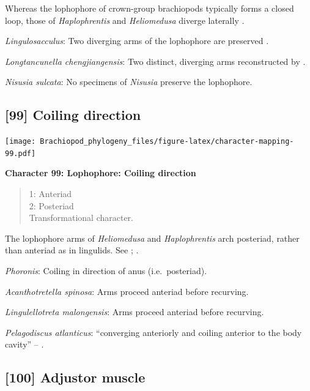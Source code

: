 \documentclass[]{book}
\theoremstyle{definition}
\theoremstyle{definition}
\theoremstyle{definition}
\theoremstyle{remark}
\begin{document}
Whereas the lophophore of crown-group brachiopods typically forms a
closed loop, those of \emph{Haplophrentis} and \emph{Heliomedusa}
diverge laterally \citep{Moysiuk2017Hyolithsare}.

\emph{Lingulosacculus}: Two diverging arms of the lophophore are
preserved \citep{Balthasar2009EarlyCambrian}.

\emph{Longtancunella chengjiangensis}: Two distinct, diverging arms
reconstructed by \citet{Zhang2007Agregarious}.

\emph{Nisusia sulcata}: No specimens of \emph{Nisusia} preserve the
lophophore.

\hypertarget{coiling-direction}{%
\subsection*{{[}99{]} Coiling direction}\label{coiling-direction}}

\texttt{[image: Brachiopod\_phylogeny\_files/figure-latex/character-mapping-99.pdf]}

\textbf{Character 99: Lophophore: Coiling direction}

\begin{quote}
1: Anteriad\\
2: Posteriad\\
Transformational character.
\end{quote}

The lophophore arms of \emph{Heliomedusa} and \emph{Haplophrentis} arch
posteriad, rather than anteriad as in lingulids. See
\citet{Zhang2009Architectureand}; \citet{Moysiuk2017Hyolithsare}.

\emph{Phoronis}: Coiling in direction of anus (i.e.~posteriad).

\emph{Acanthotretella spinosa}: Arms proceed anteriad before recurving.

\emph{Lingulellotreta malongensis}: Arms proceed anteriad before
recurving.

\emph{Pelagodiscus atlanticus}: ``converging anteriorly and coiling
anterior to the body cavity'' -- \citet{Zhang2009Architectureand}.

\hypertarget{adjustor-muscle}{%
\subsection*{{[}100{]} Adjustor muscle}\label{adjustor-muscle}}
\end{document}
